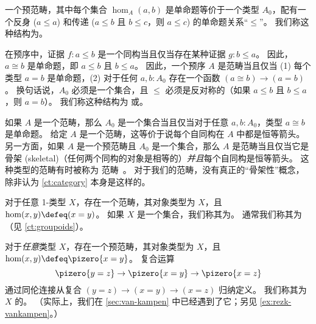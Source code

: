 \begin{eg}\label{ct:orders}
一个预范畴，其中每个集合 $\hom_A(a,b)$ 是单命题等价于一个类型 $A_0$，配有一个反身 ($a\le a$) 和传递 ($a\le b$ 且 $b\le c$，则 $a\le c$) 的单命题关系“$\le$”。
我们称这种结构为。

在预序中，证据 $f: a\le b$ 是一个同构当且仅当存在某种证据 $g: b\le a$。
因此，$a\cong b$ 是单命题，即 $a\le b$ 且 $b\le a$。
因此，一个预序 $A$ 是范畴当且仅当 (1) 每个类型 $a=b$ 是单命题，(2) 对于任何 $a,b:A_0$ 存在一个函数 $(a\cong b) \to (a=b)$。
换句话说，$A_0$ 必须是一个集合，且 $\le$ 必须是反对称的（如果 $a\le b$ 且 $b\le a$，则 $a=b$）。
我们称这种结构为 或。%
%
\end{eg}

\begin{eg}\label{ct:gaunt}
如果 $A$ 是一个范畴，那么 $A_0$ 是一个集合当且仅当对于任意 $a,b:A_0$，类型 $a\cong b$ 是单命题。
给定 $A$ 是一个范畴，这等价于说每个自同构在 $A$ 中都是恒等箭头。另一方面，如果 $A$ 是一个预范畴且 $A_0$ 是一个集合，那么 $A$ 是范畴当且仅当它是骨架 (skeletal)（任何两个同构的对象是相等的）\emph{并且}每个自同构是恒等箭头。
这种类型的范畴有时被称为 范畴~\cite{bsp12infncats}。%
%
%
%
对于我们的范畴，没有真正的“骨架性”概念，除非认为 \cref{ct:category} 本身是这样的。
\end{eg}

\begin{eg}\label{ct:discrete}
对于任意 1-类型 $X$，存在一个范畴，其对象类型为 $X$，且 $\hom(x,y) \defeq (x=y)$。
如果 $X$ 是一个集合，我们称其为。%
%
通常我们称其为（见 \cref{ct:groupoids}）。
\end{eg}

\begin{eg}\label{ct:fundgpd}
对于\emph{任意}类型 $X$，存在一个预范畴，其对象类型为 $X$，且 $\hom(x,y) \defeq \pizero{x=y}$。
复合运算
\[ \pizero{y=z} \to \pizero{x=y} \to \pizero{x=z} \]
通过同伦连接从复合 $(y=z)\to(x=y)\to(x=z)$ 归纳定义。
我们称其为 $X$ 的。%
%
（实际上，我们在 \cref{sec:van-kampen} 中已经遇到了它；另见 \cref{ex:rezk-vankampen}。）
\end{eg}

